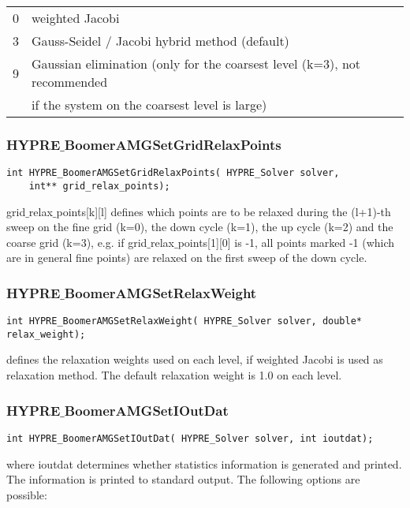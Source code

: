 \begin{tabular}{l l}
 0 & weighted Jacobi \\
 3 & Gauss-Seidel / Jacobi hybrid method (default) \\
 9 & Gaussian elimination (only for the coarsest level (k=3), not recommended\\ 
 & if the system on the coarsest level is large)\\
\end{tabular}

\subsubsection*{HYPRE$\_$BoomerAMGSetGridRelaxPoints}
\begin{display}
\begin{verbatim}
int HYPRE_BoomerAMGSetGridRelaxPoints( HYPRE_Solver solver, 
	int** grid_relax_points);
\end{verbatim}
\end{display}
grid$\_$relax$\_$points[k][l] defines which points are to be relaxed during
the (l+1)-th sweep on the fine 
grid (k=0), the down cycle (k=1), the up cycle (k=2) and the coarse grid (k=3),
e.g. if grid$\_$relax$\_$points[1][0] is -1, all points marked -1 (which are in
general fine points) are relaxed on the first sweep of the down cycle.

\subsubsection*{HYPRE$\_$BoomerAMGSetRelaxWeight}
\begin{display}
\begin{verbatim}
int HYPRE_BoomerAMGSetRelaxWeight( HYPRE_Solver solver, double* relax_weight);
\end{verbatim}
\end{display}
defines the relaxation weights used on each level, if weighted Jacobi is used
as relaxation method. The default relaxation weight is 1.0 on each level.

\subsubsection*{HYPRE$\_$BoomerAMGSetIOutDat}
\begin{display}
\begin{verbatim}
int HYPRE_BoomerAMGSetIOutDat( HYPRE_Solver solver, int ioutdat);
\end{verbatim}
\end{display}
where ioutdat determines whether statistics information is generated and 
printed. The information is printed to standard output.
The following options are possible:

